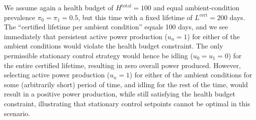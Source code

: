 \documentclass{article}
\begin{document}
    We assume again a health budget of $H^\text{total} = 100$ and equal ambient-condition prevalence $\pi_0 = \pi_1 = 0.5$, but this time with a fixed lifetime of $L^\text{cert} = 200$ days. The ``certified lifetime per ambient condition'' equals 100 days, and we see immediately that persistent active power production ($u_n = 1$) for either of the ambient conditions would violate the health budget constraint. The only permissible stationary control strategy would hence be idling ($u_0 = u_1 = 0$) for the entire certified lifetime, resulting in zero overall power produced. However, selecting active power production ($u_n = 1$) for either of the ambient conditions for some (arbitrarily short) period of time, and idling for the rest of the time, would result in a positive power production, while still satisfying the health budget constraint, illustrating that stationary control setpoints cannot be optimal in this scenario.
    
\end{document}
